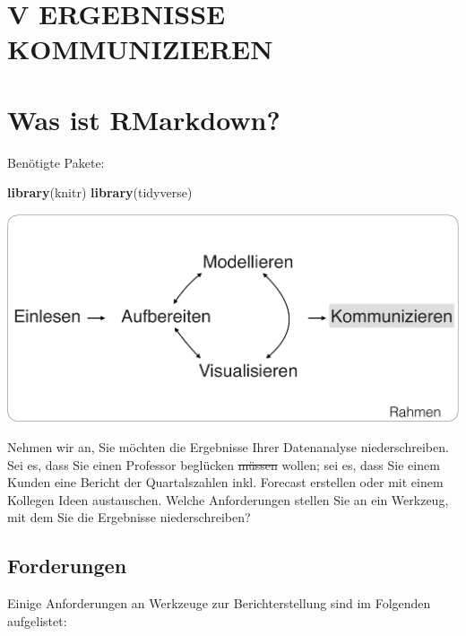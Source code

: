 \documentclass[12pt,]{book}
\newenvironment{Shaded}{\begin{snugshade}}{\end{snugshade}}
\newcommand{\KeywordTok}[1]{\textcolor[rgb]{0.13,0.29,0.53}{\textbf{{#1}}}}
\newcommand{\NormalTok}[1]{{#1}}
\begin{document}
\chapter*{V ERGEBNISSE KOMMUNIZIEREN}\label{v-ergebnisse-kommunizieren}

\chapter{Was ist RMarkdown?}\label{was-ist-rmarkdown}

Benötigte Pakete:

\begin{Shaded}
\begin{Highlighting}[]
\KeywordTok{library}\NormalTok{(knitr)}
\KeywordTok{library}\NormalTok{(tidyverse)}
\end{Highlighting}
\end{Shaded}

\begin{center}\includegraphics[width=0.7\linewidth]{images/Kommunizieren} \end{center}

Nehmen wir an, Sie möchten die Ergebnisse Ihrer Datenanalyse
niederschreiben. Sei es, dass Sie einen Professor beglücken
\sout{müssen} wollen; sei es, dass Sie einem Kunden eine Bericht der
Quartalszahlen inkl. Forecast erstellen oder mit einem Kollegen Ideen
austauschen. Welche Anforderungen stellen Sie an ein Werkzeug, mit dem
Sie die Ergebnisse niederschreiben?

\section{Forderungen}\label{forderungen}

Einige Anforderungen an Werkzeuge zur Berichterstellung sind im
Folgenden aufgelistet:
\end{document}
